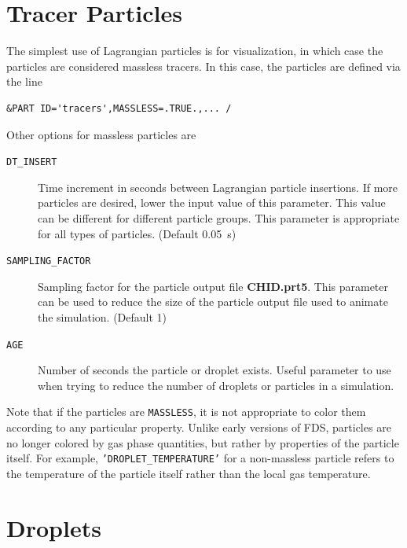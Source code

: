 \documentclass[11pt]{book}
\newcommand{\ct}{\tt\small}
\begin{document}
\section{Tracer Particles}

The simplest use of Lagrangian particles is for visualization, in which case the
particles are considered massless tracers. In this case, the particles are
defined via the line

\footnotesize
\begin{verbatim}
&PART ID='tracers',MASSLESS=.TRUE.,... /
\end{verbatim}
\normalsize

\noindent
Other options for massless particles are
\begin{description}
\item[{\ct DT\_INSERT}]    Time increment in seconds between Lagrangian particle insertions.
If more particles are desired, lower the input value of this parameter. This value can be different
for different particle groups. This parameter is appropriate for all types of particles. (Default 0.05~s)
\item[{\ct SAMPLING\_FACTOR}]     Sampling factor for the particle output
file {\bf CHID.prt5}. This parameter can be used to reduce the size
of the particle output file used to animate the simulation. (Default 1)
\item[{\ct AGE}]  Number of seconds the particle or droplet exists. Useful parameter to use when
trying to reduce the number of droplets or particles in a simulation.
\end{description}
Note that if the
particles are {\ct MASSLESS}, it is not appropriate to color them according to any particular property.
Unlike early versions of FDS, particles are no longer
colored by gas phase quantities, but rather by properties of the particle itself. For example,
{\ct 'DROPLET\_TEMPERATURE'} for a non-massless particle refers to the temperature of the particle itself
rather than the local gas temperature.


\section{Droplets}
\end{document}
